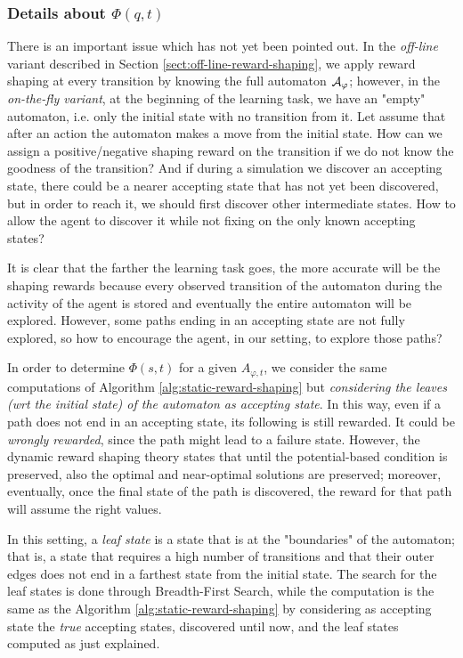 \subsubsection{Details about $\Phi(q, t)$}
There is an important issue which has not yet been pointed out. In the \emph{off-line} variant described in Section \ref{sect:off-line-reward-shaping}, we apply reward shaping at every transition by knowing the full automaton $\mathcal{A}_\varphi$; however, in the \emph{on-the-fly variant}, at the beginning of the learning task, we have an "empty" automaton, i.e. only the initial state with no transition from it. 
Let assume that after an action the automaton makes a move from the initial state. How can we assign a positive/negative shaping reward on the transition if we do not know the goodness of the transition?
And if during a simulation we discover an accepting state, there could be a nearer accepting state that has not yet been discovered, but in order to reach it, we should first discover other intermediate states. How to allow the agent to discover it while not fixing on the only known accepting states?

It is clear that the farther the learning task goes, the more accurate will be the shaping rewards because every observed transition of the automaton during the activity of the agent is stored and eventually the entire automaton will be explored. However, some paths ending in an accepting state are not fully explored, so how to encourage the agent, in our setting, to explore those paths?

In order to determine $\Phi(s, t)$ for a given $A_{\varphi, t}$, we consider the same computations of Algorithm \ref{alg:static-reward-shaping} but \emph{considering the leaves (wrt the initial state) of the automaton as accepting state}. In this way, even if a path does not end in an accepting state, its following is still rewarded. It could be \emph{wrongly rewarded}, since the path might lead to a failure state. However, the dynamic reward shaping theory states that until the potential-based condition is preserved, also the optimal and near-optimal solutions are preserved; moreover, eventually, once the final state of the path is discovered, the reward for that path will assume the right values.

In this setting, a \emph{leaf state} is a state that is at the "boundaries" of the automaton; that is, a state that requires a high number of transitions and that their outer edges does not end in a farthest state from the initial state. 
The search for the leaf states is done through Breadth-First Search, while the computation is the same as the Algorithm \ref{alg:static-reward-shaping} by considering as accepting state the \emph{true} accepting states, discovered until now, and the leaf states computed as just explained.

